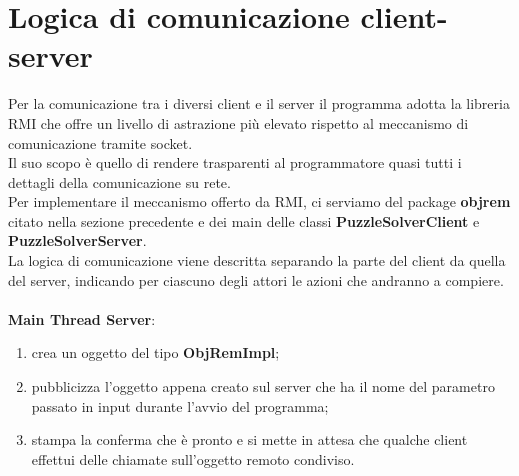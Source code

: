 % 
%
%

\section{Logica di comunicazione client-server} %
\label{sec:logica_di_comunicazione_client_server}
Per la comunicazione tra i diversi client e il server il programma adotta la libreria RMI che offre un livello di astrazione più elevato rispetto al meccanismo di comunicazione tramite socket. \\
Il suo scopo è quello di rendere trasparenti al programmatore quasi tutti i dettagli della comunicazione su rete. \\
Per implementare il meccanismo offerto da RMI, ci serviamo del package \textbf{objrem} citato nella sezione precedente e dei main delle classi \textbf{PuzzleSolverClient} e \textbf{PuzzleSolverServer}. \\
La logica di comunicazione viene descritta separando la parte del client da quella del server, indicando per ciascuno degli attori le azioni che andranno a compiere. \\ \\

\textbf{Main Thread Server}:
	\begin{enumerate}
		\item crea un oggetto del tipo \textbf{ObjRemImpl}; 
		\item pubblicizza l'oggetto appena creato sul server che ha il nome del parametro passato in input durante l'avvio del programma; 
		\item stampa la conferma che è pronto e si mette in attesa che qualche client effettui delle chiamate sull'oggetto remoto condiviso.
	\end{enumerate}
	\noindent

